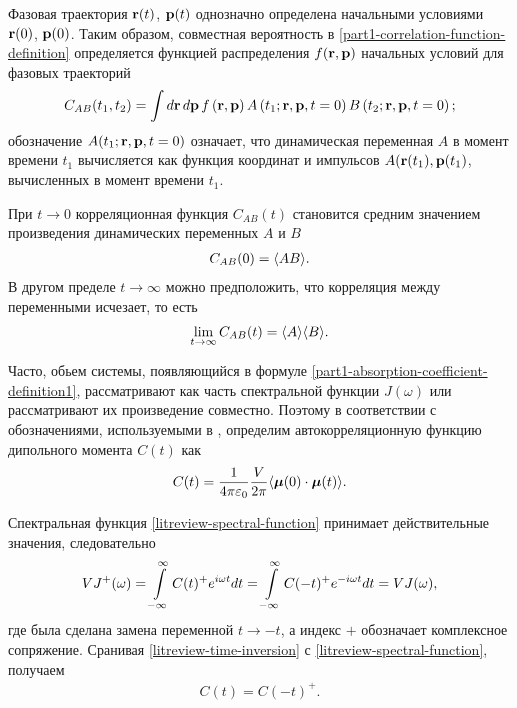 Фазовая траектория $\mathbf{r}(t)$, $\mathbf{p}(t)$ однозначно определена начальными условиями $\mathbf{r}(0)$, $\mathbf{p}(0)$. Таким образом, совместная вероятность в \eqref{part1-correlation-function-definition} определяется функцией распределения $f(\mathbf{r}, \mathbf{p})$ начальных условий для фазовых траекторий
\begin{gather}
    C_{AB}(t_1, t_2) = \int d\mathbf{r} \, d\mathbf{p} \, f \left( \mathbf{r}, \mathbf{p} \right) A\left( t_1; \mathbf{r}, \mathbf{p}, t = 0 \right) B \left( t_2; \mathbf{r}, \mathbf{p}, t = 0 \right);
\end{gather}
%
обозначение $A(t_1; \mathbf{r}, \mathbf{p}, t = 0)$ означает, что динамическая переменная $A$ в момент времени $t_1$ вычисляется как функция координат и импульсов $A(\mathbf{r}(t_1), \mathbf{p}(t_1)$, вычисленных в момент времени $t_1$. \par
    При $t \rightarrow 0$ корреляционная функция $C_{AB}(t)$ становится средним значением произведения динамических переменных $A$ и $B$
\begin{gather}
    C_{AB}(0) = \langle AB \rangle.
\end{gather}
%
В другом пределе $t \rightarrow \infty$ можно предположить, что корреляция между переменными исчезает, то есть
\begin{gather}
    \lim_{t \rightarrow \infty} C_{AB}(t) = \langle A \rangle \langle B \rangle.
\end{gather}

Часто, обьем системы, появляющийся в формуле \eqref{part1-absorption-coefficient-definition1}, рассматривают как часть спектральной функции $J(\omega)$ или рассматривают их произведение совместно. Поэтому в соответствии с обозначениями, используемыми в \cite{frommhold}, определим автокорреляционную функцию дипольного момента $C(t)$ как
\begin{gather}
    C(t) = \frac{1}{4 \pi \varepsilon_0} \frac{V}{2\pi} \langle \boldsymbol{\mu}(0) \cdot \boldsymbol{\mu}(t) \rangle. \label{litreview-autocorrelation-function-definition}
\end{gather}

Спектральная функция \eqref{litreview-spectral-function} принимает действительные значения, следовательно
\begin{gather}
    V J^+(\omega) = \int\limits_{-\infty}^\infty C(t)^+ e^{i \omega t} dt = \int\limits_{-\infty}^\infty C(-t)^+ e^{-i\omega t} dt = VJ(\omega), \label{litreview-time-inversion}
\end{gather}
%
где была сделана замена переменной $t \rightarrow -t$, а индекс $+$ обозначает комплексное сопряжение. Сранивая \eqref{litreview-time-inversion} с \eqref{litreview-spectral-function}, получаем
\begin{gather}
    C(t) = C(-t)^+.
\end{gather}


